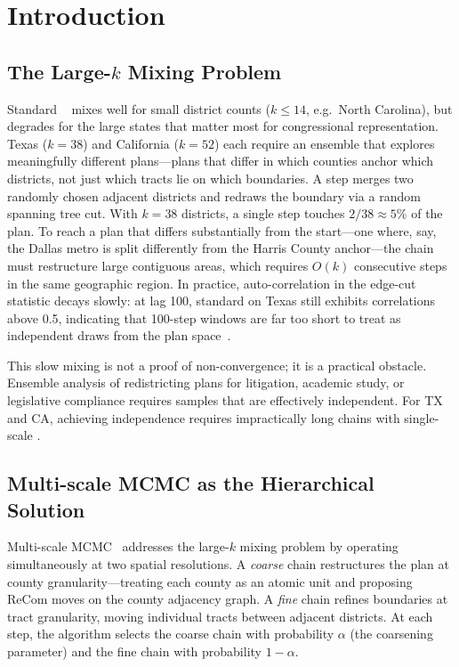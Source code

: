 \section{Introduction}
\label{sec:introduction}

\subsection{The Large-$k$ Mixing Problem}

Standard \recom{}~\citep{deford2021} mixes well for small district counts
($k \leq 14$, e.g.\ North Carolina), but degrades for the large states that
matter most for congressional representation.
Texas ($k = 38$) and California ($k = 52$) each require an ensemble that
explores meaningfully different plans---plans that differ in which counties
anchor which districts, not just which tracts lie on which boundaries.
A \recom{} step merges two randomly chosen adjacent districts and redraws
the boundary via a random spanning tree cut.
With $k = 38$ districts, a single step touches $2/38 \approx 5\%$ of the
plan.
To reach a plan that differs substantially from the start---one where, say,
the Dallas metro is split differently from the Harris County anchor---the
chain must restructure large contiguous areas, which requires $O(k)$ consecutive
steps in the same geographic region.
In practice, auto-correlation in the edge-cut statistic decays slowly: at
lag 100, standard \recom{} on Texas still exhibits correlations above 0.5,
indicating that 100-step windows are far too short to treat as independent
draws from the plan space~\citep{autry2021}.

This slow mixing is not a proof of non-convergence; it is a practical
obstacle.
Ensemble analysis of redistricting plans for litigation, academic study, or
legislative compliance requires samples that are effectively independent.
For TX and CA, achieving independence requires impractically long chains
with single-scale \recom{}.

\subsection{Multi-scale MCMC as the Hierarchical Solution}

Multi-scale MCMC~\citep{autry2021} addresses the large-$k$ mixing problem
by operating simultaneously at two spatial resolutions.
A \emph{coarse} chain restructures the plan at county granularity---treating
each county as an atomic unit and proposing ReCom moves on the county
adjacency graph.
A \emph{fine} chain refines boundaries at tract granularity, moving
individual tracts between adjacent districts.
At each step, the algorithm selects the coarse chain with probability
$\alpha$ (the coarsening parameter) and the fine chain with probability
$1 - \alpha$.

